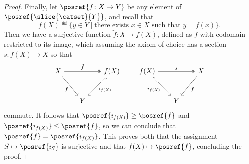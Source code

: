 \begin{proof}
        Finally, let $\posref{f\colon X \to Y}$ be any element of $\posref{\slice{\catset}{Y}}$, and recall that
        \begin{equation*}
            f(X) \eqdef \{y \in Y \mid \text{there exists $x \in X$ such that $y = f(x)$}\}.
        \end{equation*}
        Then we have a surjective function $\tilde{f}\colon X \to f(X)$, defined as $f$ with codomain restricted to its image, which assuming the axiom of choice has a section $s\colon f(X) \to X$ so that
        \[\begin{tikzcd}[sep=scriptsize]
	X && {f(X)} \\
	\\
	& Y
	\arrow["f"', from=1-1, to=3-2]
	\arrow["{\imath_{f(X)}}", hook, from=1-3, to=3-2]
	\arrow["{\tilde{f}}", two heads, from=1-1, to=1-3]
\end{tikzcd}
        \quad \quad 
        \begin{tikzcd}[sep=scriptsize]
	{f(X)} && X \\
	\\
	& Y
	\arrow["{\imath_{f(X)}}"', hook, from=1-1, to=3-2]
	\arrow["f", from=1-3, to=3-2]
	\arrow["s", two heads, from=1-1, to=1-3]
\end{tikzcd}\]
        commute. 
        It follows that $\posref{\imath_{f(X)}} \geq \posref{f}$ and $\posref{\imath_{f(X)}} \leq \posref{f}$, so we can conclude that $\posref{f} = \posref{\imath_{f(X)}}$.
        This proves both that the assignment $S \mapsto \posref{\imath_S}$ is surjective and that $f(X) \mapsto \posref{f}$, concluding the proof.
    \end{proof}

